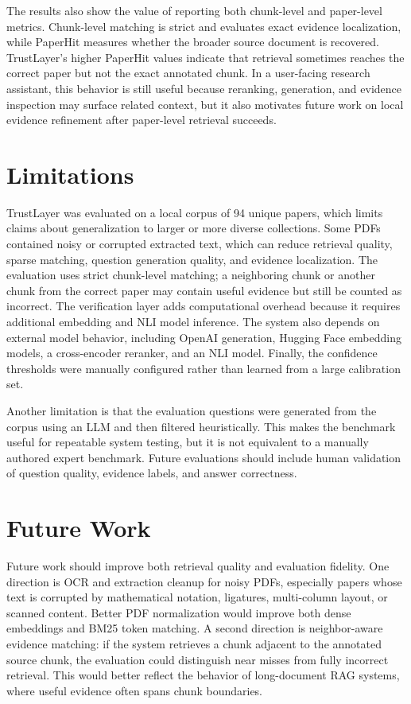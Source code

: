 \documentclass[11pt]{article}
\begin{document}
The results also show the value of reporting both chunk-level and paper-level metrics. Chunk-level matching is strict and evaluates exact evidence localization, while PaperHit measures whether the broader source document is recovered. TrustLayer's higher PaperHit values indicate that retrieval sometimes reaches the correct paper but not the exact annotated chunk. In a user-facing research assistant, this behavior is still useful because reranking, generation, and evidence inspection may surface related context, but it also motivates future work on local evidence refinement after paper-level retrieval succeeds.

\section{Limitations}

TrustLayer was evaluated on a local corpus of 94 unique papers, which limits claims about generalization to larger or more diverse collections. Some PDFs contained noisy or corrupted extracted text, which can reduce retrieval quality, sparse matching, question generation quality, and evidence localization. The evaluation uses strict chunk-level matching; a neighboring chunk or another chunk from the correct paper may contain useful evidence but still be counted as incorrect. The verification layer adds computational overhead because it requires additional embedding and NLI model inference. The system also depends on external model behavior, including OpenAI generation, Hugging Face embedding models, a cross-encoder reranker, and an NLI model. Finally, the confidence thresholds were manually configured rather than learned from a large calibration set.

Another limitation is that the evaluation questions were generated from the corpus using an LLM and then filtered heuristically. This makes the benchmark useful for repeatable system testing, but it is not equivalent to a manually authored expert benchmark. Future evaluations should include human validation of question quality, evidence labels, and answer correctness.

\section{Future Work}

Future work should improve both retrieval quality and evaluation fidelity. One direction is OCR and extraction cleanup for noisy PDFs, especially papers whose text is corrupted by mathematical notation, ligatures, multi-column layout, or scanned content. Better PDF normalization would improve both dense embeddings and BM25 token matching. A second direction is neighbor-aware evidence matching: if the system retrieves a chunk adjacent to the annotated source chunk, the evaluation could distinguish near misses from fully incorrect retrieval. This would better reflect the behavior of long-document RAG systems, where useful evidence often spans chunk boundaries.
\end{document}
